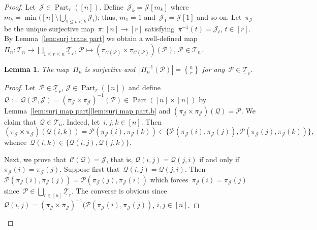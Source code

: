 \documentclass[10pt,a4paper]{amsart}
\newtheorem{lemma}{Lemma}
\DeclareMathOperator{\Part}{Part}
\newcommand{\tstirling}[2]{\genfrac{\{}{\}}{0pt}1{#1}{#2}}
\begin{document}
\begin{proof}
Let~$\mathcal J\in\Part_r([n])$.
Define~$\mathcal J_k=\mathcal J[m_k]$ where~$m_k=\min\big([n]
\setminus \bigcup_{1\le t<k} \mathcal J_t\big)$; thus, $m_1=1$
and~$\mathcal J_1=\mathcal J[1]$ and so on.
Let~$\pi_{\mathcal J}$ be the unique surjective map~$\pi:[n]\to[r]$
satisfying~$\pi^{-1}(t)=\mathcal J_t$, $t\in[r]$. 
By Lemma~\ref{lem:surj trans part} 
we obtain a well-defined map~$\Pi_n:\mathscr T_n\to \bigsqcup_{1\le r\le n}
\underline{\mathscr T}_r$, $\mathcal P\mapsto (\pi_{\mathcal C(\mathcal P)}\times \pi_{\mathcal C(\mathcal P)})(\mathcal P)$,
$\mathcal P\in\mathscr T_n$.
\begin{lemma}\label{lem:collapse part}
The map~$\Pi_n$ is surjective and~$|\Pi_n^{-1}(\mathcal P)|=\tstirling{n}{r}$ 
for any~$\mathcal P\in\underline{\mathscr T}_r$. 
\end{lemma}
\begin{proof}
Let~$\mathcal P\in\underline{\mathscr T}_r$, 
$\mathcal J\in\Part_r([n])$ and define~$\mathcal Q:=\mathcal Q(\mathcal P,\mathcal J)=(\pi_{\mathcal J}\times\pi_{\mathcal J})^{-1}(\mathcal P)\in \Part([n]\times[n])$ by Lemma~\ref{lem:surj map part}\ref{lem:surj map part.b} and $(\pi_{\mathcal J}\times\pi_{\mathcal J})(\mathcal Q)=\mathcal P$.
We claim that~$\mathcal Q\in \mathscr T_n$. Indeed,
let~$i,j,k\in[n]$. Then
$$
(\pi_{\mathcal J}\times\pi_{\mathcal J})(\mathcal Q(i,k))=\mathcal P(\pi_{\mathcal J}(i),\pi_{\mathcal J}(k))\in 
\{ \mathcal P(\pi_{\mathcal J}(i),\pi_{\mathcal J}(j)),\mathcal P(\pi_{\mathcal J}(j),\pi_{\mathcal J}(k))\},
$$
whence~$\mathcal Q(i,k)\in\{ \mathcal Q(i,j),
\mathcal Q(j,k)\}$. 

Next, we prove that~$\mathcal C(\mathcal Q)=\mathcal J$,
that is, $\mathcal Q(i,j)=\mathcal Q(j,i)$ if and only if~$\pi_{\mathcal J}(i)=\pi_{\mathcal J}(j)$. Suppose first that~$\mathcal Q(i,j)=\mathcal Q(j,i)$. Then $\mathcal P(\pi_{\mathcal J}(i),\pi_{\mathcal J}(j))=
\mathcal P(\pi_{\mathcal J}(j),\pi_{\mathcal J}(i))
$ which forces~$\pi_{\mathcal J}(i)=\pi_{\mathcal J}(j)$
since~$\mathcal P\in\bigsqcup_{r\in[n]}\underline{\mathscr T}_r$. 
The converse is obvious
since~$\mathcal Q(i,j)=(\pi_{\mathcal J}\times\pi_{\mathcal J})^{-1}(
\mathcal P(\pi_{\mathcal J}(i),\pi_{\mathcal J}(j))$, $i,j\in[n]$.


\end{proof}
\end{proof}
\end{document}
